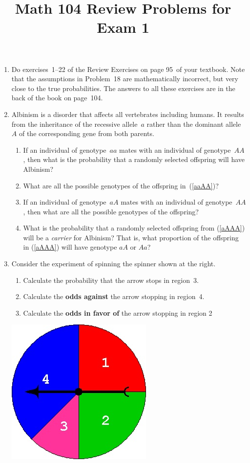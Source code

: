 \documentclass[12pt]{article}
\author{}\date{}
\title{Math 104 Review Problems for Exam 1}\author{}
\begin{document}
\maketitle
\pagestyle{empty}
\begin{enumerate}
\item Do exercises~1--22 of the Review Exercises
on page 95~of your textbook. Note that the assumptions
in Problem~18 are mathematically incorrect,
but very close to the true probabilities.
The answers to all these exercises are in the
back of the book on page~104.
\item Albinism is a disorder that affects all vertebrates
including humans. It results from the inheritance
of the recessive allele~$a$ rather than the dominant
allele~$A$ of the corresponding gene from both parents.
\begin{enumerate}
\item\label{aaAA} If an individual of genotype~$aa$ mates with
an individual of genotype~$AA$, then what is the probability
that a randomly selected offspring will have Albinism?
\item What are all the possible genotypes of the offspring
in~(\ref{aaAA})?
\item\label{aAAA} If an individual of genotype~$aA$ mates with
an individual of genotype~$AA$, then
what are all the possible genotypes of the offspring?
\item What is the probability that a randomly selected
offspring from (\ref{aAAA})
will be a {\em carrier} for Albinism? That is,
what proportion of the offspring in  (\ref{aAAA})
will have genotype $aA$ or $Aa$?
\end{enumerate}

\item\label{Spinner}\begin{multicols}{2}
Consider the experiment of spinning the spinner
shown at the right.
\begin{enumerate}
\item Calculate the probability that the arrow stops
in region~3.
\item Calculate the {\bf odds against} the arrow stopping
in region~4.
\item Calculate the {\bf odds in favor of} the arrow
stopping in region 2
\end{enumerate}
\includegraphics[scale=.5]{R1Spinner}
\end{multicols}


\end{enumerate}
\end{document}
